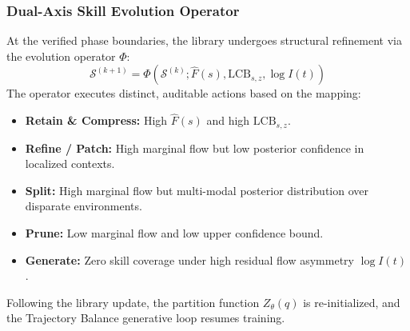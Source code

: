 \documentclass[12pt]{article}
\begin{document}
\subsubsection{Dual-Axis Skill Evolution Operator}
At the verified phase boundaries, the library undergoes structural refinement via the evolution operator $\Phi$:
\begin{equation}
\mathcal{S}^{(k+1)} = \Phi(\mathcal{S}^{(k)}; \hat{F}(s), \text{LCB}_{s,z}, \log I(t))
\end{equation}
The operator executes distinct, auditable actions based on the mapping:
\begin{itemize}
    \item \textbf{Retain \& Compress:} High $\hat{F}(s)$ and high $\text{LCB}_{s,z}$.
    \item \textbf{Refine / Patch:} High marginal flow but low posterior confidence in localized contexts.
    \item \textbf{Split:} High marginal flow but multi-modal posterior distribution over disparate environments.
    \item \textbf{Prune:} Low marginal flow and low upper confidence bound.
    \item \textbf{Generate:} Zero skill coverage under high residual flow asymmetry $\log I(t)$.
\end{itemize}
Following the library update, the partition function $Z_\theta(q)$ is re-initialized, and the Trajectory Balance generative loop resumes training.
\end{document}
